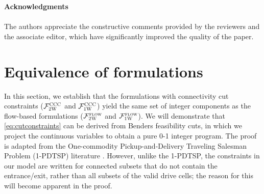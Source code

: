 \documentclass[10pt]{article}
\theoremstyle{definition}
\begin{document}
\vspace{5mm}
{\large \textbf{Acknowledgments}}\\
\\
The authors appreciate the constructive comments provided by the reviewers and the associate editor, which have significantly improved the quality of the paper.

\newpage
\appendix
\label{sec:appendix}
\renewcommand{\thesection}{Appendix \Alph{section}}
\renewcommand{\thesubsection}{\Alph{section}.\arabic{subsection}}

\section{Equivalence of formulations}
\label{sec:equivalence}
In this section, we establish that the formulations with connectivity cut constraints ($\mathcal{F}_{\textsc{2W}}^{\textsc{CCC}}$ and  $\mathcal{F}_{\textsc{1W}}^{\textsc{CCC}}$) yield the same set of integer components as the flow-based formulations ($\mathcal{F}_{\textsc{2W}}^{\textsc{flow}}$ and $\mathcal{F}_{\textsc{1W}}^{\textsc{flow}}$). We will demonstrate that \eqref{eq:cutconstraints} can be derived from Benders feasibility cuts, in which we project the continuous variables to obtain a pure 0-1 integer program. The proof is adapted from the One-commodity Pickup-and-Delivery Traveling Salesman Problem (1-PDTSP) literature \citep{hernandez2003one}. However, unlike the 1-PDTSP, the constraints in our model are written for connected subsets that do not contain the entrance/exit, rather than all subsets of the valid drive cells; the reason for this will become apparent in the proof.
\end{document}
